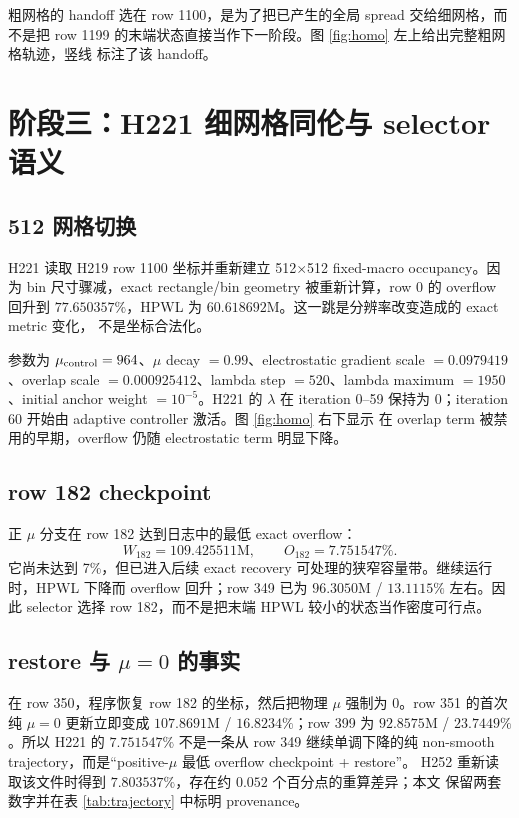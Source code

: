 \documentclass[UTF8,a4paper,11pt]{ctexrep}
\begin{document}
粗网格的 handoff 选在 row 1100，是为了把已产生的全局 spread 交给细网格，而不是把
row 1199 的末端状态直接当作下一阶段。图 \ref{fig:homo} 左上给出完整粗网格轨迹，竖线
标注了该 handoff。

\chapter{阶段三：H221 细网格同伦与 selector 语义}

\section{512 网格切换}
H221 读取 H219 row 1100 坐标并重新建立 512$\times$512 fixed-macro occupancy。因为
bin 尺寸骤减，exact rectangle/bin geometry 被重新计算，row 0 的 overflow 回升到
$77.650357\%$，HPWL 为 $60.618692$M。这一跳是分辨率改变造成的 exact metric 变化，
不是坐标合法化。

参数为 $\mu_{\rm control}=964$、$\mu$ decay $=0.99$、electrostatic gradient scale
$=0.0979419$、overlap scale $=0.000925412$、lambda step $=520$、lambda maximum
$=1950$、initial anchor weight $=10^{-5}$。H221 的 $\lambda$ 在 iteration 0--59
保持为 0；iteration 60 开始由 adaptive controller 激活。图 \ref{fig:homo} 右下显示
在 overlap term 被禁用的早期，overflow 仍随 electrostatic term 明显下降。

\section{row 182 checkpoint}
正 $\mu$ 分支在 row 182 达到日志中的最低 exact overflow：
\[
  W_{182}=109.425511\text{M},\qquad O_{182}=7.751547\%.
\]
它尚未达到 7\%，但已进入后续 exact recovery 可处理的狭窄容量带。继续运行时，HPWL
下降而 overflow 回升；row 349 已为 $96.3050$M / $13.1115\%$ 左右。因此 selector
选择 row 182，而不是把末端 HPWL 较小的状态当作密度可行点。

\section{\texorpdfstring{restore 与 $\mu=0$ 的事实}{restore 与 mu=0 的事实}}
在 row 350，程序恢复 row 182 的坐标，然后把物理 $\mu$ 强制为 0。row 351 的首次
纯 $\mu=0$ 更新立即变成 $107.8691$M / $16.8234\%$；row 399 为 $92.8575$M /
$23.7449\%$。所以 H221 的 $7.751547\%$ 不是一条从 row 349 继续单调下降的纯
non-smooth trajectory，而是“positive-$\mu$ 最低 overflow checkpoint + restore”。
H252 重新读取该文件时得到 $7.803537\%$，存在约 $0.052$ 个百分点的重算差异；本文
保留两套数字并在表 \ref{tab:trajectory} 中标明 provenance。
\end{document}
